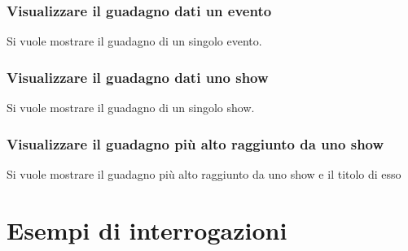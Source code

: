 \documentclass[a4paper,11pt]{article}
\begin{document}
\subsubsection{Visualizzare il guadagno dati un evento}
Si vuole mostrare il guadagno di un singolo evento.


\subsubsection{Visualizzare il guadagno dati uno show}
Si vuole mostrare il guadagno di un singolo show.


\subsubsection{Visualizzare il guadagno pi\`u alto raggiunto da uno show}
Si vuole mostrare il guadagno pi\`u alto raggiunto da uno show e il titolo di esso


\section{Esempi di interrogazioni}
\end{document}
